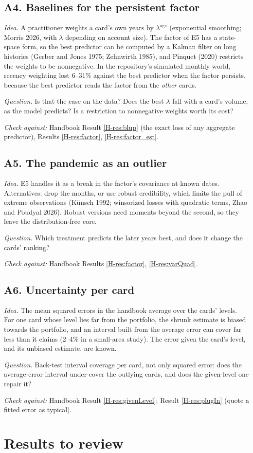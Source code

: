 \documentclass[10pt]{article}
\newcommand{\hb}[1]{\ref*{H-#1}}
\newcommand{\other}[4]{%
  \subsection*{#1}
  \textit{Idea.} #2\par\smallskip
  \textit{Question.} #3\par\smallskip
  {\small\textit{Check against:} #4}\par}
\begin{document}
\other{A4. Baselines for the persistent factor}
{A practitioner weights a card's own years by $\lambda^{\text{age}}$ (exponential smoothing; Morris
2026, with $\lambda$ depending on account size). The factor of E5 has a state-space form, so the
best predictor can be computed by a Kalman filter on long histories (Gerber and Jones 1975;
Zehnwirth 1985), and Pinquet (2020) restricts the weights to be nonnegative. In the repository's
simulated monthly world, recency weighting lost 6--31\% against the best predictor when the factor
persists, because the best predictor reads the factor from the \emph{other} cards.}
{Is that the case on the data? Does the best $\lambda$ fall with a card's volume, as the model
predicts? Is a restriction to nonnegative weights worth its cost?}
{Handbook Result \hb{res:blup} (the exact loss of any aggregate predictor), Results \hb{res:factor}, \hb{res:factor_est}.}

\other{A5. The pandemic as an outlier}
{E5 handles it as a break in the factor's covariance at known dates. Alternatives: drop the months,
or use robust credibility, which limits the pull of extreme observations (Künsch 1992; winsorized
losses with quadratic terms, Zhao and Poudyal 2026). Robust versions need moments beyond the
second, so they leave the distribution-free core.}
{Which treatment predicts the later years best, and does it change the cards' ranking?}
{Handbook Results \hb{res:factor}, \hb{res:varQuad}.}

\other{A6. Uncertainty per card}
{The mean squared errors in the handbook average over the cards' levels. For one card whose level
lies far from the portfolio, the shrunk estimate is biased towards the portfolio, and an interval
built from the average error can cover far less than it claims (2--4\% in a small-area study).
The error given the card's level, and its unbiased estimate, are known.}
{Back-test interval coverage per card, not only squared error: does the average-error interval
under-cover the outlying cards, and does the given-level one repair it?}
{Handbook Result \hb{res:givenLevel}; Result \hb{res:plugIn} (quote a fitted error as typical).}

\section{Results to review}\label{sec:review}
\end{document}
